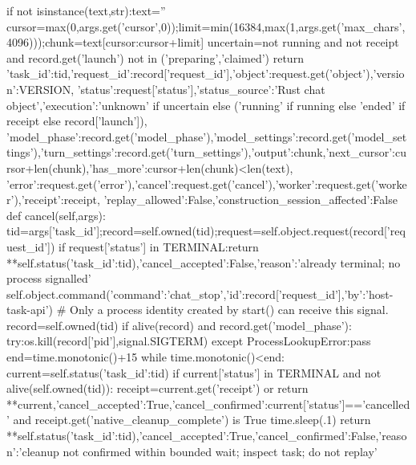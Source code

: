         if not isinstance(text,str):text=''
        cursor=max(0,args.get('cursor',0));limit=min(16384,max(1,args.get('max_chars',4096)));chunk=text[cursor:cursor+limit]
        uncertain=not running and not receipt and record.get('launch') not in ('preparing','claimed')
        return {'task_id':tid,'request_id':record['request_id'],'object':request.get('object'),'version':VERSION,
                'status':request['status'],'status_source':'Rust chat object','execution':'unknown' if uncertain else ('running' if running else 'ended' if receipt else record['launch']),
                'model_phase':record.get('model_phase'),'model_settings':record.get('model_settings'),'turn_settings':record.get('turn_settings'),'output':chunk,'next_cursor':cursor+len(chunk),'has_more':cursor+len(chunk)<len(text),
                'error':request.get('error'),'cancel':request.get('cancel'),'worker':request.get('worker'),'receipt':receipt,
                'replay_allowed':False,'construction_session_affected':False}
    def cancel(self,args):
        tid=args['task_id'];record=self.owned(tid);request=self.object.request(record['request_id'])
        if request['status'] in TERMINAL:return {**self.status({'task_id':tid}),'cancel_accepted':False,'reason':'already terminal; no process signalled'}
        self.object.command({'command':'chat_stop','id':record['request_id'],'by':'host-task-api'})
        # Only a process identity created by start() can receive this signal.
        record=self.owned(tid)
        if alive(record) and record.get('model_phase'):
            try:os.kill(record['pid'],signal.SIGTERM)
            except ProcessLookupError:pass
        end=time.monotonic()+15
        while time.monotonic()<end:
            current=self.status({'task_id':tid})
            if current['status'] in TERMINAL and not alive(self.owned(tid)):
                receipt=current.get('receipt') or {}
                return {**current,'cancel_accepted':True,'cancel_confirmed':current['status']=='cancelled' and receipt.get('native_cleanup_complete') is True}
            time.sleep(.1)
        return {**self.status({'task_id':tid}),'cancel_accepted':True,'cancel_confirmed':False,'reason':'cleanup not confirmed within bounded wait; inspect task; do not replay'}


